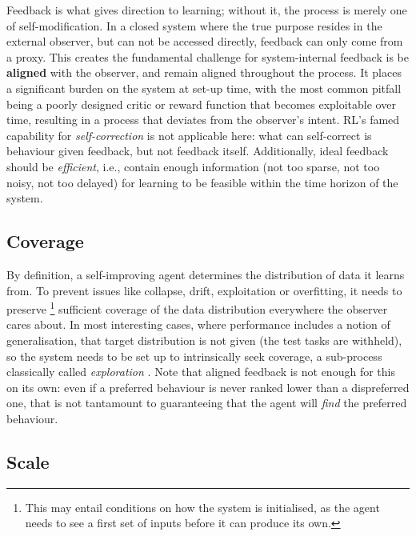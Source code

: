 \documentclass[dvipsnames]{article} %
\begin{document}
Feedback is what gives direction to learning; without it, the process is merely one of self-modification. 
In a closed system where the true purpose resides in the external observer, but can not be accessed directly, feedback can only come from a proxy. 
This creates the fundamental challenge for system-internal feedback is be {\bf aligned} with the observer, and remain aligned throughout the process. It places a significant burden on the system at set-up time, with the most common pitfall being a poorly designed critic or reward function that becomes exploitable over time, resulting in a process that deviates from the observer's intent. 
RL's famed capability for \emph{self-correction} is not applicable here: what can self-correct is behaviour given feedback, but not feedback itself.
%
Additionally, ideal feedback should be \emph{efficient}, i.e., contain enough information (not too sparse, not too noisy, not too delayed) for learning to be feasible within the time horizon of the system. 


\subsection{Coverage}
\label{sec:coverage}

By definition, a self-improving agent determines the distribution of data it learns from. 
To prevent issues like collapse, drift, exploitation or overfitting, it needs to preserve%
\footnote{This may entail conditions on how the system is initialised, as the agent needs to see a first set of inputs before it can produce its own.}
sufficient coverage of the data distribution everywhere the observer cares about.
%
In most interesting cases, where performance includes a notion of generalisation, that target distribution is not given (the test tasks are withheld), so the system needs to be set up to intrinsically seek coverage, a sub-process classically called \emph{exploration} \citep{ladosz2022exploration}.
Note that aligned feedback is not enough for this on its own: even if a preferred behaviour is never ranked lower than a dispreferred one, that is not tantamount to guaranteeing that the agent will \emph{find} the preferred behaviour.

\subsection{Scale}
\label{sec:capacity}
\end{document}
